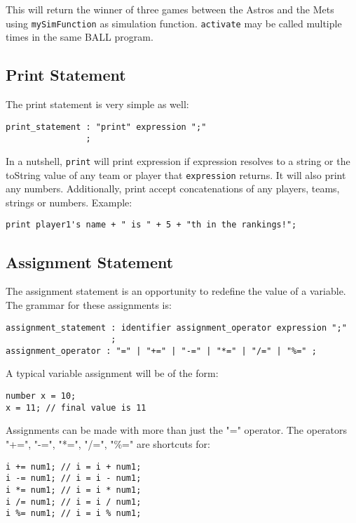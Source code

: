 This will return the winner of three games between the Astros and the
Mets using \texttt{mySimFunction} as simulation
function. \texttt{activate} may be called multiple times in the same
BALL program.

\subsection{Print Statement}

The print statement is very simple as well: 

\begin{verbatim}
print_statement : "print" expression ";"
                ;
\end{verbatim}

In a nutshell, \texttt{print} will print expression if expression
resolves to a string or the toString value of any team or player that
\texttt{expression} returns. It will also print any
numbers. Additionally, print accept concatenations of any players,
teams, strings or numbers. Example:

\begin{verbatim}
print player1's name + " is " + 5 + "th in the rankings!";
\end{verbatim}

\subsection{Assignment Statement}
The assignment statement is an opportunity to redefine the value of a
variable. The grammar for these assignments is:

\begin{verbatim}
assignment_statement : identifier assignment_operator expression ";"
                     ;
assignment_operator : "=" | "+=" | "-=" | "*=" | "/=" | "%=" ;
\end{verbatim}

A typical variable assignment will be of the form:

\begin{verbatim}
number x = 10;
x = 11; // final value is 11
\end{verbatim}

Assignments can be made with more than just the "=" operator. The
operators "+=", "-=", "*=", "/=", "\%=" are shortcuts for:

\begin{verbatim}
i += num1; // i = i + num1;
i -= num1; // i = i - num1;
i *= num1; // i = i * num1;
i /= num1; // i = i / num1;
i %= num1; // i = i % num1;
\end{verbatim}
 
